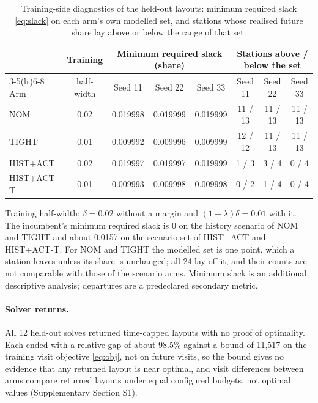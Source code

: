 \begin{table}[htbp]
\centering
\caption{Training-side diagnostics of the held-out layouts: minimum required slack \eqref{eq:slack} on each arm's own modelled set, and stations whose realised future share lay above or below the range of that set.}
\label{tab:heldout_diag}
\small
\setlength{\tabcolsep}{4pt}
\begin{tabular}{@{}lccccccc@{}}
\toprule
 & Training & \multicolumn{3}{c}{Minimum required slack (share)} & \multicolumn{3}{c}{Stations above / below the set} \\
\cmidrule(lr){3-5}\cmidrule(lr){6-8}
Arm & half-width & Seed 11 & Seed 22 & Seed 33 & Seed 11 & Seed 22 & Seed 33 \\
\midrule
NOM        & 0.02 & 0.019998 & 0.019999 & 0.019999 & 11 / 13 & 11 / 13 & 11 / 13 \\
TIGHT      & 0.01 & 0.009992 & 0.009996 & 0.009999 & 12 / 12 & 11 / 13 & 11 / 13 \\
HIST+ACT   & 0.02 & 0.019997 & 0.019997 & 0.019999 & 1 / 3 & 3 / 4 & 0 / 4 \\
HIST+ACT-T & 0.01 & 0.009993 & 0.009998 & 0.009998 & 0 / 2 & 1 / 4 & 0 / 4 \\
\bottomrule
\end{tabular}
\par\smallskip
\begin{minipage}{\linewidth}\footnotesize
Training half-width: $\delta=0.02$ without a margin and $(1-\lambda)\delta=0.01$ with it. The incumbent's minimum required slack is 0 on the history scenario of NOM and TIGHT and about 0.0157 on the scenario set of HIST+ACT and HIST+ACT-T. For NOM and TIGHT the modelled set is one point, which a station leaves unless its share is unchanged; all 24 lay off it, and their counts are not comparable with those of the scenario arms. Minimum slack is an additional descriptive analysis; departures are a predeclared secondary metric.
\end{minipage}
\end{table}

\paragraph{Solver returns.} All 12 held-out solves returned time-capped layouts with no proof of optimality. Each ended with a relative gap of about 98.5\% against a bound of 11,517 on the training visit objective \eqref{eq:obj}, not on future visits, so the bound gives no evidence that any returned layout is near optimal, and visit differences between arms compare returned layouts under equal configured budgets, not optimal values (Supplementary Section S1).

